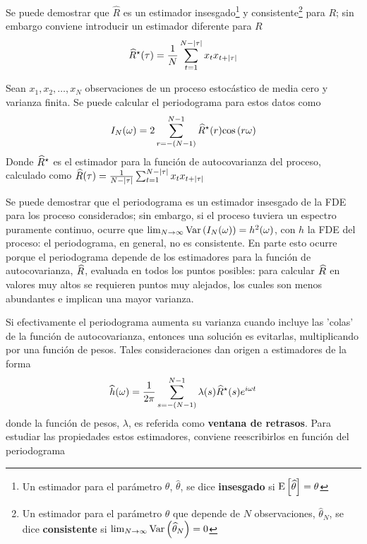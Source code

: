 Se puede demostrar que $\widehat{R}$ es un estimador insesgado\footnote{Un estimador para el 
parámetro $\theta$, $\widehat{\theta}$, se dice \textbf{insesgado} si 
$\mathrm{E}\left[ \widehat{\theta} \right]=\theta$} y consistente\footnote{Un estimador para el parámetro $\theta$ que 
depende de $N$ observaciones, 
$\widehat{\theta}_N$, se dice \textbf{consistente} si 
$\lim_{N\rightarrow \infty} \mathrm{Var}\left( \widehat{\theta}_N \right) = 0$} 
para $R$; sin embargo conviene introducir un estimador diferente para $R$
\begin{equation*}
\widehat{ R }^{\star}(\tau) = \frac{1}{N} 
\sum_{t = 1}^{N-\left| \tau \right|} x_t x_{t+\left| \tau \right|}
\label{estimador_R_ast}
\end{equation*}

\begin{teorema}
Sean $x_1, x_2 , \dots, x_N$ observaciones de un proceso estocástico de media cero y varianza
finita. Se puede calcular el periodograma para estos datos como
\begin{equation*}
I_N(\omega) = 2 \sum_{r = -(N-1)}^{N-1} \widehat{ R }^{\star}(r) \mathrm{cos}\left( r \omega \right)
\end{equation*}
Donde $\widehat{ R }^{\star}$ es el estimador para la función de autocovarianza del proceso, calculado como
$\widehat{R}(\tau) = \frac{1}{N-\left| \tau \right|} \sum_{t = 1}^{N-\left| \tau \right|} x_t x_{t+\left| \tau \right|}$
\label{periodograma_rho}
\end{teorema}

Se puede demostrar que el periodograma es un estimador insesgado de la FDE para los proceso 
considerados; sin embargo, si el proceso tuviera un espectro puramente continuo, ocurre que 
$\lim_{N\rightarrow \infty} \mathrm{Var}\left( I_N(\omega) \right) = h^{2}(\omega)$, con $h$ la FDE del proceso: el 
periodograma, en general, no es consistente.
En parte esto ocurre porque el periodograma depende de los estimadores para la función de 
autocovarianza, $\widehat{ R }$, evaluada en todos los puntos posibles: para calcular $\widehat{ R }$ en 
valores muy altos se requieren puntos muy alejados, los cuales son menos abundantes e implican 
una mayor varianza.

Si efectivamente el periodograma aumenta su varianza cuando incluye las 'colas' de la función de 
autocovarianza, entonces una solución es evitarlas, multiplicando por una función de pesos. 
Tales consideraciones dan origen a estimadores de la forma
\begin{equation*}
\widehat{ h }(\omega) = \frac{1}{2\pi} \sum_{s = -(N-1)}^{N-1} 
\lambda(s) \widehat{ R }^{\star}(s) e^{i \omega t}
\label{ventaneando}
\end{equation*}
donde la función de pesos, $\lambda$, es referida como \textbf{ventana de retrasos}. Para 
estudiar las propiedades estos estimadores, conviene reescribirlos en función del periodograma

